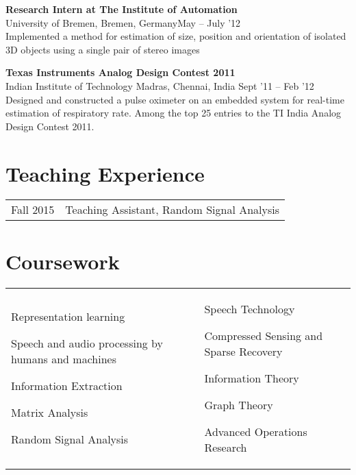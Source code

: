 \documentclass[margin,line,pifont,palatino,courier]{res}
\newenvironment{list1}{
  \begin{list}{\ding{113}}{%
      \setlength{\itemsep}{0in}
      \setlength{\parsep}{0in} \setlength{\parskip}{0in}
      \setlength{\topsep}{0in} \setlength{\partopsep}{0in}
      \setlength{\leftmargin}{0.17in}}}{\end{list}}
\begin{document}
\begin{resume}
\textbf{Research Intern at The Institute of Automation}  \\
University of Bremen, Bremen, Germany\hfill May -- July '12 \vspace{2pt}\\
Implemented a method for estimation of size, position and orientation of
isolated 3D objects using a single pair of stereo images \\
\vspace{-5pt}

\textbf{Texas Instruments Analog Design Contest 2011} \\
Indian Institute of Technology Madras, Chennai, India \hfill Sept '11 -- Feb '12 \vspace{2pt} \\
Designed and constructed a pulse oximeter on an embedded system for real-time estimation of respiratory rate. Among the top 25 entries to the TI India Analog Design Contest 2011.\\
\vspace{-5pt}

\section{\sc Teaching Experience}
\begin{tabular}{@{}p{0.9in} p{4in}}
Fall 2015 & Teaching Assistant, Random Signal Analysis \\
\end{tabular}


\section{\sc Coursework}

\begin{tabular}{@{}p{2.3in}p{3in}}
\begin{list1}
\item Representation learning
\item Speech and audio processing by humans and machines
\item Information Extraction
\item Matrix Analysis
\item Random Signal Analysis

\end{list1}
&
\begin{list1}
\item Speech Technology
\item Compressed Sensing and Sparse Recovery
\item Information Theory
\item Graph Theory
\item Advanced Operations Research
\end{list1}


\end{tabular}
\end{resume}
\end{document}
